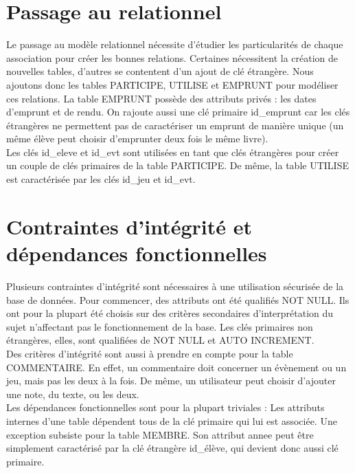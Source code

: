 \documentclass[a4paper, 11pt]{article}
\begin{document}
\section{Passage au relationnel}
Le passage au modèle relationnel nécessite d'étudier les particularités de chaque association pour créer les bonnes relations. Certaines nécessitent la création de nouvelles tables, d'autres se contentent d'un ajout de clé étrangère. Nous ajoutons donc les tables PARTICIPE, UTILISE et EMPRUNT pour modéliser ces relations. La table EMPRUNT possède des attributs privés : les dates d'emprunt et de rendu. On rajoute aussi une clé primaire id\_emprunt car les clés étrangères ne permettent pas de caractériser un emprunt de manière unique (un m\^eme élève peut choisir d'emprunter deux fois le m\^eme livre).\\
Les clés id\_eleve et id\_evt sont utilisées en tant que clés étrangères pour créer un couple de clés primaires de la table PARTICIPE. De m\^eme, la table UTILISE est caractérisée par les clés id\_jeu et id\_evt.
\section{Contraintes d'intégrité et dépendances fonctionnelles}
Plusieurs contraintes d'intégrité sont nécessaires à une utilisation sécurisée de la base de données. Pour commencer, des attributs ont été qualifiés NOT NULL. Ils ont pour la plupart été choisis sur des critères secondaires d'interprétation du sujet n'affectant pas le fonctionnement de la base. Les clés primaires non étrangères, elles, sont qualifiées de NOT NULL et AUTO INCREMENT.\\
Des critères d'intégrité sont aussi à prendre en compte pour la table COMMENTAIRE. En effet, un commentaire doit concerner un évènement ou un jeu, mais pas les deux à la fois. De m\^eme, un utilisateur peut choisir d'ajouter une note, du texte, ou les deux.\\
Les dépendances fonctionnelles sont pour la plupart triviales : Les attributs internes d'une table dépendent tous de la clé primaire qui lui est associée. Une exception subsiste pour la table MEMBRE. Son attribut annee peut \^etre simplement caractérisé par la clé étrangère id\_élève, qui devient donc aussi clé primaire.
\end{document}
